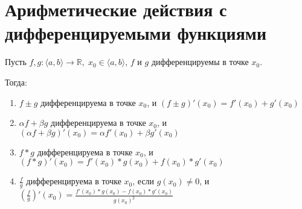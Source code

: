 \section{Арифметические действия с дифференцируемыми функциями \href{https://youtu.be/OXDjegAsmSU?t=2141}{\Walley}}
Пусть $f, g: \langle a, b \rangle \to \mathbb{R}, \; x_0 \in \langle a, b \rangle$, $f$ и $g$ дифференцируемы в точке $x_0$.

Тогда:
\begin{enumerate}
    \item $f \pm g$ дифференцируема в точке $x_0$, и $(f \pm g)'(x_0) = f'(x_0) + g'(x_0)$
    \item $\alpha f + \beta g$ дифференцируема в точке $x_0$, и $(\alpha f + \beta g)'(x_0) = \alpha f'(x_0) + \beta g'(x_0)$
    \item $f * g$ дифференцируема в точке $x_0$, и $(f * g)'(x_0) = f'(x_0) * g(x_0) + f(x_0) * g'(x_0)$
    \item $\frac{f}{g}$ дифференцируема в точке $x_0$, если $g(x_0) \neq 0$, и $(\frac{f}{g})'(x_0) = \frac{f'(x_0) * g(x_0) - f(x_0) * g'(x_0)}{g(x_0)^2}$
\end{enumerate}
